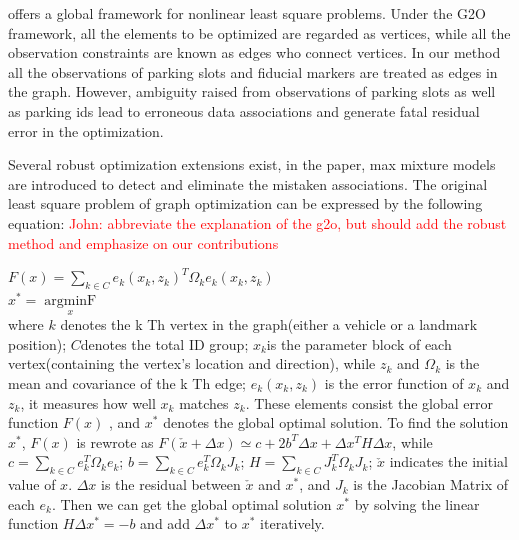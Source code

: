 \documentclass[journal]{IEEEtran}
\newcommand{\COMMENT}[1]{\textcolor{red}{#1}}
\begin{document}

\cite{K2011G2o} offers a global framework for nonlinear least square problems. 
Under the G2O framework, all the elements to be optimized are regarded as vertices, while all the observation constraints are known as edges who connect vertices. 
In our method all the observations of parking slots and fiducial markers are treated as edges in the graph. 
However, ambiguity raised from observations of parking slots as well as parking ids lead to erroneous data associations and generate fatal residual error in the optimization. 

Several robust optimization extensions exist, in the paper, max mixture models are introduced
to detect and eliminate the mistaken associations\citep{Pfingsthorn2014Representing}.
The original least square problem of graph optimization can be expressed by the following equation:
\COMMENT{John: abbreviate the explanation of the g2o, but should add the robust method and emphasize on our contributions}

$F(x)=\sum\limits_{k \in C}e_k{(x_k,z_k)}^T{\Omega}_k e_k(x_k,z_k)$\cite{K2011G2o}\\
$x^{*} = \mathop{argminF(x)}\limits_x$\cite{K2011G2o}\\
where $k$ denotes the k Th vertex in the graph(either a vehicle or a landmark position);  
$C$denotes the total ID group; $x_k$is the parameter block of each vertex(containing the vertex’s location and direction), 
while $z_k$ and $\Omega_k$ is the mean and covariance of the k Th edge; 
$e_k(x_k,z_k)$ is the error function of $x_k$ and $z_k$, it measures how well $x_k$ matches $z_k$. 
These elements consist the global error function $F(x)$ , and $x^*$ denotes the global optimal solution.
To find the solution $x^*$, $F(x)$ is rewrote as $F(\check{x}+\Delta x)\simeq c+2b^T \Delta x + \Delta x^T H \Delta x$, 
while $c=\sum\limits_{k \in C}e_k^T \Omega_k e_k$; 
$b=\sum\limits_{k \in C}e_k^T \Omega_k J_k$; 
$H=\sum\limits_{k \in C}J_k^T \Omega_k J_k$; 
$\check{x}$ indicates the initial value of ${x}$. 
$\Delta x$ is the residual between $\check{x}$  and $x^*$, and $J_k$ is the Jacobian Matrix of each $e_k$. 
Then we can get the global optimal solution $x^*$ by solving the linear function $H\Delta x^*=-b$ and add $\Delta x^*$ to $x^*$ iteratively.
\end{document}
